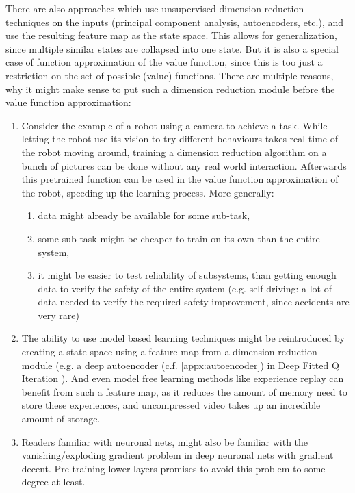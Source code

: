 There are also approaches which use unsupervised dimension reduction techniques on the inputs (principal component analysis, autoencoders, etc.), and use the resulting feature map as the state space. This allows for generalization, since multiple similar states are collapsed into one state. But it is also a special case of function approximation of the value function, since this is too just a restriction on the set of possible (value) functions. There are multiple reasons, why it might make sense to put such a dimension reduction module before the value function approximation:
\begin{enumerate}
	\item Consider the example of a robot using a camera to achieve a task. While letting the robot use its vision to try different behaviours takes real time of the robot moving around, training a dimension reduction algorithm on a bunch of pictures can be done without any real world interaction. Afterwards this pretrained function can be used in the value function approximation of the robot, speeding up the learning process. More generally:
	\begin{enumerate}
		\item data might already be available for some sub-task,
		\item some sub task might be cheaper to train on its own than the entire system,
		\item it might be easier to test reliability of subsystems, than getting enough data to verify the safety of the entire system (e.g. self-driving: a lot of data needed to verify the required safety improvement, since accidents are very rare)
	\end{enumerate}
	\item The ability to use model based learning techniques might be reintroduced by creating a state space using a feature map from a dimension reduction module (e.g. a deep autoencoder (c.f. \ref{appx:autoencoder}) in Deep Fitted Q Iteration \cite{langeBatchReinforcementLearning2012}). And even model free learning methods like experience replay can benefit from such a feature map, as it reduces the amount of memory need to store these experiences, and uncompressed video takes up an incredible amount of storage.
	\item Readers familiar with neuronal nets, might also be familiar with the vanishing/exploding gradient problem in deep neuronal nets with gradient decent. Pre-training lower layers promises to avoid this problem to some degree at least. 
\end{enumerate}

